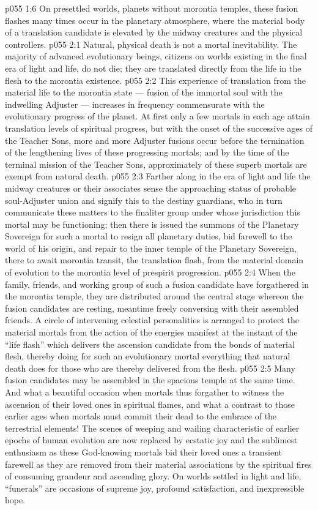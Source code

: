 \vs p055 1:6 \pc On presettled worlds, planets without morontia temples, these fusion flashes many times occur in the planetary atmosphere, where the material body of a translation candidate is elevated by the midway creatures and the physical controllers.
\vs p055 2:1 Natural, physical death is not a mortal inevitability. The majority of advanced evolutionary beings, citizens on worlds existing in the final era of light and life, do not die; they are translated directly from the life in the flesh to the morontia existence.
\vs p055 2:2 This experience of translation from the material life to the morontia state --- fusion of the immortal soul with the indwelling Adjuster --- increases in frequency commensurate with the evolutionary progress of the planet. At first only a few mortals in each age attain translation levels of spiritual progress, but with the onset of the successive ages of the Teacher Sons, more and more Adjuster fusions occur before the termination of the lengthening lives of these progressing mortals; and by the time of the terminal mission of the Teacher Sons, approximately  of these superb mortals are exempt from natural death.
\vs p055 2:3 \pc Farther along in the era of light and life the midway creatures or their associates sense the approaching status of probable soul\hyp{}Adjuster union and signify this to the destiny guardians, who in turn communicate these matters to the finaliter group under whose jurisdiction this mortal may be functioning; then there is issued the summons of the Planetary Sovereign for such a mortal to resign all planetary duties, bid farewell to the world of his origin, and repair to the inner temple of the Planetary Sovereign, there to await morontia transit, the translation flash, from the material domain of evolution to the morontia level of prespirit progression.
\vs p055 2:4 \pc When the family, friends, and working group of such a fusion candidate have forgathered in the morontia temple, they are distributed around the central stage whereon the fusion candidates are resting, meantime freely conversing with their assembled friends. A circle of intervening celestial personalities is arranged to protect the material mortals from the action of the energies manifest at the instant of the “life flash” which delivers the ascension candidate from the bonds of material flesh, thereby doing for such an evolutionary mortal everything that natural death does for those who are thereby delivered from the flesh.
\vs p055 2:5 Many fusion candidates may be assembled in the spacious temple at the same time. And what a beautiful occasion when mortals thus forgather to witness the ascension of their loved ones in spiritual flames, and what a contrast to those earlier ages when mortals must commit their dead to the embrace of the terrestrial elements! The scenes of weeping and wailing characteristic of earlier epochs of human evolution are now replaced by ecstatic joy and the sublimest enthusiasm as these God\hyp{}knowing mortals bid their loved ones a transient farewell as they are removed from their material associations by the spiritual fires of consuming grandeur and ascending glory. On worlds settled in light and life, “funerals” are occasions of supreme joy, profound satisfaction, and inexpressible hope.
